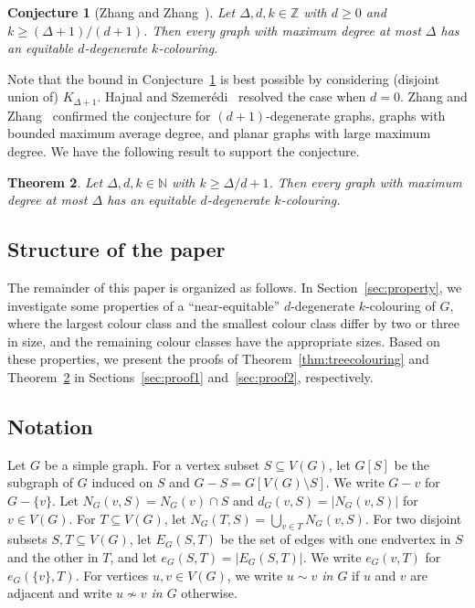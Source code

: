 \documentclass[11pt]{article}
\theoremstyle{plain}
\newtheorem{thm}{Theorem}[section]
\newtheorem{conj}[thm]{Conjecture}
\numberwithin{equation}{section}
\begin{document}
	\begin{conj}[Zhang and Zhang~\cite{ZZ2021}]\label{conj:EDC}
   Let $\Delta, d, k\in \mathbb{Z}$ with $d \ge 0$ and $k \ge (\Delta+1)/(d+1)$.
    Then every graph with maximum degree at most $\Delta$ has an equitable $d$-degenerate $k$-colouring.
	\end{conj}

Note that the bound in Conjecture~\ref{conj:EDC} is best possible by considering (disjoint union of) $K_{\Delta+1}$. Hajnal and Szemer\'{e}di~\cite{HS1970} resolved the case when $d=0$. Zhang and Zhang~\cite{ZZ2021} confirmed the conjecture for $(d+1)$-degenerate graphs, graphs with bounded maximum average degree, and planar graphs with large maximum degree. We have the following result to support the conjecture.
	
\begin{thm}\label{thm:degeneratecolouring}
    Let $\Delta, d, k\in \mathbb{N}$ with $k \ge \Delta/d+1$.
    Then every graph with maximum degree at most $\Delta$ has an equitable $d$-degenerate $k$-colouring.
	\end{thm}
	




\subsection{Structure of the paper}

The remainder of this paper is organized as follows. In Section~\ref{sec:property},  we investigate  some properties  of a ``near-equitable''  $d$-degenerate $k$-colouring of $G$, where the  largest colour class and the smallest colour class differ by two or three  in size, and the remaining colour classes have the appropriate sizes.  Based on these properties, we present the proofs of Theorem~\ref{thm:treecolouring} and Theorem~\ref{thm:degeneratecolouring} in Sections~\ref{sec:proof1} and~\ref{sec:proof2}, respectively.

\subsection{Notation}

Let $G$ be a simple graph. For a vertex subset $S \subseteq V(G)$, let $G[S]$ be the subgraph of $G$ induced on $S$ and $G-S=G[V(G)\setminus S]$. We write $G-v$ for   $G-\{v\}$.
Let $N_G(v,S) = N_G(v) \cap S$ and $d_G(v,S) = |N_G(v,S)|$ for $v\in V(G)$.
For $T\subseteq V(G)$, let $N_G(T,S) = \bigcup_{v\in T}N_G(v,S)$.
For two disjoint subsets $S, T \subseteq V(G)$, let $E_G(S,T)$ be the set of edges with one endvertex in $S$ and the other in $T$, and let
$e_G(S,T) = |E_G(S,T)|$.   We write $e_G(v,T)$ for   $e_G(\{v\}, T)$.
For vertices $u,v \in V(G)$, we write \emph{$u \sim v$ in $G$} if $u$ and $v$ are adjacent and  write \emph{$u \not\sim v$ in $G$} otherwise.
\end{document}
